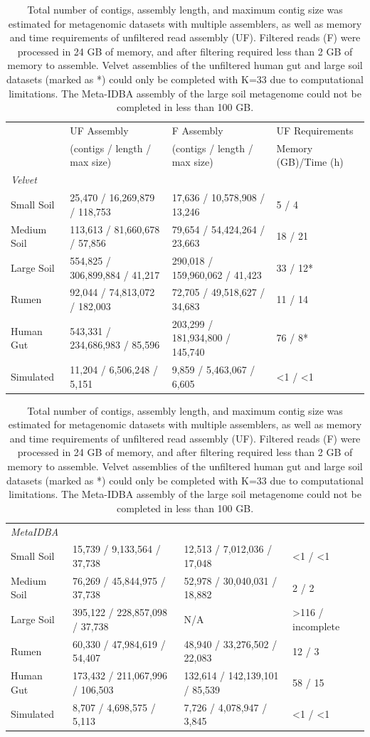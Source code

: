 \documentclass[10pt]{article}
\begin{document}
\begin{table}[ht]
\caption{Total number of contigs, assembly length, and maximum contig size was estimated for metagenomic datasets with multiple assemblers, as well as memory and time requirements of unfiltered read assembly (UF).  Filtered reads (F) were processed in 24 GB of memory, and after filtering required less than 2 GB of memory to assemble.  Velvet assemblies of the unfiltered human gut and large soil datasets (marked as *) could only be completed with K=33 due to computational limitations.  The Meta-IDBA assembly of the large soil metagenome could not be completed in less than 100 GB.}


 
\begin{tabular}{l l l l}
\hline
&UF Assembly &F Assembly 	&UF Requirements \\
& (contigs / length / max size) 	& (contigs / length / max size) 	& Memory (GB)/Time (h)\\

\hline

\emph{Velvet}\\
Small Soil 	&25,470 / 16,269,879 / 118,753	&17,636 / 10,578,908 / 13,246		&5 / 4\\
Medium Soil	&113,613 / 81,660,678 / 57,856	&79,654 / 54,424,264 / 23,663		&18 / 21\\
Large Soil 	&554,825 / 306,899,884 / 41,217 	&290,018 / 159,960,062 /  41,423 	&33 / 12*\\
Rumen		&92,044 / 74,813,072 / 182,003	&72,705 / 49,518,627 / 34,683		&11 / 14\\
Human Gut	&543,331 / 234,686,983  / 85,596	&203,299 / 181,934,800 / 145,740	&76 / 8*\\
Simulated		&11,204 / 6,506,248 / 5,151		&9,859 / 5,463,067 / 6,605		&\textless1 / \textless1\\
\end{tabular}

\medskip

\begin{tabular}{l l l l}
\emph{MetaIDBA} \\ 
Small Soil		&15,739 / 9,133,564 / 37,738 		&12,513 / 7,012,036 / 17,048	&\textless1 / \textless 1 \\
Medium Soil	&76,269 / 45,844,975 / 37,738	 	&52,978 / 30,040,031 / 18,882	&2 / 2\\
Large Soil		&395,122 / 228,857,098 /  37,738	&N/A						&\textgreater116 / incomplete\\
Rumen		&60,330 / 47,984,619 / 54,407		&48,940 / 33,276,502 / 22,083		&12 / 3\\
Human Gut 	&173,432 / 211,067,996 / 106,503	&132,614 / 142,139,101 / 85,539	&58 / 15\\
Simulated		&8,707 / 4,698,575 / 5,113		&7,726 / 4,078,947 / 3,845		&\textless1 / \textless1\\
\end{tabular}
\medskip


\end{table}
\end{document}
